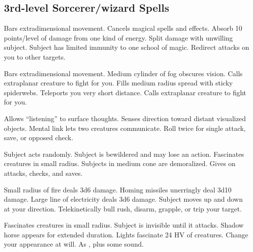 \subsection{3rd-level Sorcerer/wizard Spells} 
\begin{swspelllist}
   Bars extradimensional movement.
   Cancels magical spells and effects.
   Absorb 10 points/level of damage from one kind of energy.
   Split damage with unwilling subject.
   Subject has limited immunity to one school of magic. 
  \spellheadrestricted{}
   Redirect attacks on you to other targets.

   Bars extradimensional movement.
   Medium cylinder of fog obscures vision.
   Calls extraplanar creature to fight for you.
   Fills medium radius spread with sticky spiderwebs.
   Teleports you very short distance.
   Calls extraplanar creature to fight for you.

   Allows ``listening'' to surface thoughts.
   Senses direction toward distant visualized objects.
   Mental link lets two creatures communicate.
   Roll twice for single attack, save, or opposed check.
  \spellheadrestricted{}

   Subject acts randomly.
   Subject is bewildered and may lose an action.
   Fascinates creatures in small radius.
   Subjects in medium cone are demoralized.
   Gives  on attacks, checks, and saves.

   Small radius of fire deals 3d6 damage.
   Homing missiles unerringly deal 3d10 damage.
   Large line of electricity deals 3d6 damage.
   Subject moves up and down at your direction.
   Telekinetically bull rush, disarm, grapple, or trip your target.

   Fascinates creatures in small radius.
   Subject is invisible until it attacks.
   Shadow horse appears for extended duration.
   Lights fascinate 24 HV of creatures.
   Change your appearance at will.
   As , plus some sound.


\end{swspelllist}
